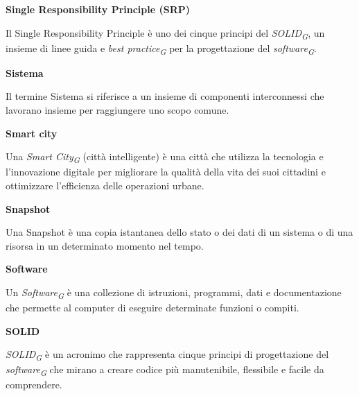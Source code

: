 \documentclass{article}
\begin{document}
\textbf{Single Responsibility Principle (SRP)}

\vspace{0.1cm}

Il Single Responsibility Principle è uno dei cinque principi del \textit{SOLID}\textsubscript{\textit{G}}, un insieme di linee guida e \textit{best practice}\textsubscript{\textit{G}} per la progettazione del \textit{software}\textsubscript{\textit{G}}.

\vspace{0.4cm}

\textbf{Sistema}

\vspace{0.1cm}

Il termine Sistema si riferisce a un insieme di componenti interconnessi che lavorano insieme per raggiungere uno scopo comune.

\vspace{0.4cm}

\textbf{Smart city}

\vspace{0.1cm}

Una \textit{Smart City}\textsubscript{\textit{G}} (città intelligente) è una città che utilizza la tecnologia e l'innovazione digitale per migliorare la qualità della vita dei suoi cittadini e ottimizzare l'efficienza delle operazioni urbane.

\vspace{0.4cm}

\textbf{Snapshot}

\vspace{0.1cm}

Una Snapshot è una copia istantanea dello stato o dei dati di un sistema o di una risorsa in un determinato momento nel tempo. 

\vspace{0.4cm}

\textbf{Software}

\vspace{0.1cm}

Un \textit{Software}\textsubscript{\textit{G}} è una collezione di istruzioni, programmi, dati e documentazione che permette al computer di eseguire determinate funzioni o compiti.

\pagebreak

\textbf{SOLID}

\vspace{0.1cm}

\textit{SOLID}\textsubscript{\textit{G}} è un acronimo che rappresenta cinque principi di progettazione del \textit{software}\textsubscript{\textit{G}} che mirano a creare codice più manutenibile, flessibile e facile da comprendere.
\end{document}
